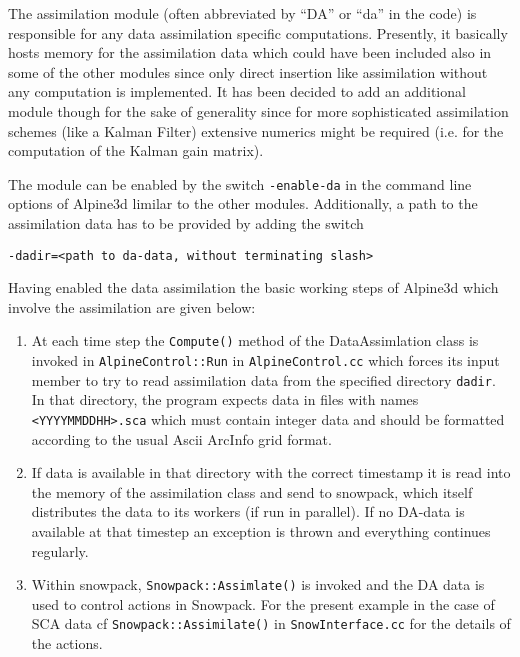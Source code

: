 \documentclass[12pt]{report}
\begin{document}
The assimilation module (often abbreviated by ``DA'' or ``da'' in the
code) is responsible for any data assimilation specific computations.
Presently, it basically hosts memory for the assimilation data which
could have been included also in some of the other modules since only
direct insertion like assimilation without any computation is
implemented. It has been decided to add an additional module though
for the sake of generality since for more sophisticated assimilation
schemes (like a Kalman Filter) extensive numerics might be required
(i.e. for the computation of the Kalman gain matrix).

The module can be enabled by the switch \verb+-enable-da+ in the
command line options of Alpine3d limilar to the other modules.
Additionally, a path to the assimilation data has to be provided 
by adding the switch

\verb+-dadir=<path to da-data, without terminating slash>+

Having enabled the data assimilation the basic working steps of
Alpine3d which involve the assimilation are given below:

\begin{enumerate}
\item At each time step the \verb+Compute()+ method of the
  DataAssimlation class is invoked in \verb+AlpineControl::Run+ in
  \verb+AlpineControl.cc+ which forces its input member to try to read
  assimilation data from the specified directory \verb+dadir+. In that
  directory, the program expects data in files with names
  \verb+<YYYYMMDDHH>.sca+ which must contain integer data and should
  be formatted according to the usual Ascii ArcInfo grid format.
\item If data is available in that directory with the correct
  timestamp it is read into the memory of the assimilation class and
  send to snowpack, which itself distributes the data to its workers
  (if run in parallel). If no DA-data is available at that timestep an
  exception is thrown and everything continues regularly.
\item Within snowpack, \verb+Snowpack::Assimlate()+ is invoked and the
  DA data is used to control actions in Snowpack. For the present
  example in the case of SCA data cf \verb+Snowpack::Assimilate()+ in
  \verb+SnowInterface.cc+ for the details of the actions.
\end{enumerate}



\end{document}
